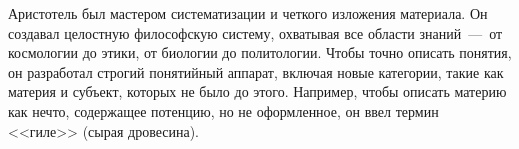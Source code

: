 
Аристотель был мастером систематизации и четкого изложения материала. Он создавал целостную философскую систему, охватывая все области знаний~---~от космологии до этики, от биологии до политологии. Чтобы точно описать понятия, он разработал строгий понятийный аппарат, включая новые категории, такие как материя и субъект, которых не было до этого. Например, чтобы описать материю как нечто, содержащее потенцию, но не оформленное, он ввел термин <<гиле>> (сырая дровесина).


